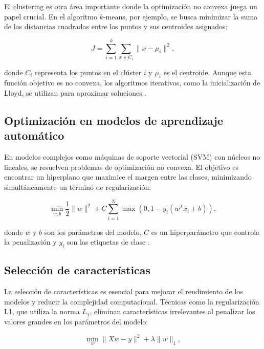 \begin{itemize}
	El clustering es otra área importante donde la optimización no convexa juega un papel crucial. En el algoritmo \(k\)-means, por ejemplo, se busca minimizar la suma de las distancias cuadradas entre los puntos y sus centroides asignados:
	
	\begin{equation}
		J = \sum_{i=1}^k \sum_{x \in C_i} \| x - \mu_i \|^2,
	\end{equation}
	
	donde \(C_i\) representa los puntos en el clúster \(i\) y \(\mu_i\) es el centroide. Aunque esta función objetivo es no convexa, los algoritmos iterativos, como la inicialización de Lloyd, se utilizan para aproximar soluciones \cite{bishop2006pattern}.
	
	\subsection{Optimización en modelos de aprendizaje automático}
	
	En modelos complejos como máquinas de soporte vectorial (SVM) con núcleos no lineales, se resuelven problemas de optimización no convexa. El objetivo es encontrar un hiperplano que maximice el margen entre las clases, minimizando simultáneamente un término de regularización:
	
	\begin{equation}
		\min_{w, b} \frac{1}{2} \|w\|^2 + C \sum_{i=1}^N \max(0, 1 - y_i (w^T x_i + b)),
	\end{equation}
	
	donde \(w\) y \(b\) son los parámetros del modelo, \(C\) es un hiperparámetro que controla la penalización y \(y_i\) son las etiquetas de clase \cite{vapnik1998statistical}.
	
	\subsection{Selección de características}
	
	La selección de características es esencial para mejorar el rendimiento de los modelos y reducir la complejidad computacional. Técnicas como la regularización L1, que utiliza la norma \(L_1\), eliminan características irrelevantes al penalizar los valores grandes en los parámetros del modelo:
	
	\begin{equation}
		\min_{w} \|Xw - y\|^2 + \lambda \|w\|_1,
	\end{equation}
	

\end{itemize}
